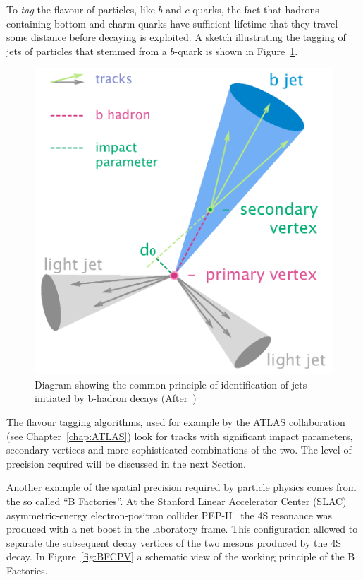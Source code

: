 To {\it tag} the flavour of particles, like $b$ and 
$c$ quarks, the fact that hadrons containing bottom and charm quarks have sufficient lifetime that they travel some distance before decaying is exploited.  A sketch illustrating the tagging of jets of particles that stemmed from a $b$-quark 
is shown in Figure~\ref{fig:B-tagging_diagram}.
\begin{figure}[!htbp]
   \centering
   \includegraphics[height=0.2\textheight]{B-tagging_diagram.png}
   \caption{\label{fig:B-tagging_diagram} Diagram showing the common principle of identification of jets initiated by b-hadron decays (After~\cite{wiki:b-tagging})}
   \end{figure}
The flavour tagging algorithms, used for example by the ATLAS collaboration (see 
Chapter~\ref{chap:ATLAS}) look for tracks with significant impact parameters, secondary vertices  
and more sophisticated combinations of the two. The level of precision required will be discussed 
in the next Section.




Another example of the spatial precision required by particle physics comes from the 
so called ``B Factories''. At the Stanford Linear Accelerator Center (SLAC) 
asymmetric-energy electron-positron collider PEP-II~\cite{37821} the \Y4S resonance was produced 
with a net boost in the laboratory frame. This configuration allowed to separate the subsequent 
decay vertices of the two \B mesons produced by the \Y4S decay. In Figure~\ref{fig:BFCPV} 
a schematic view of the working principle of the B Factories. 

